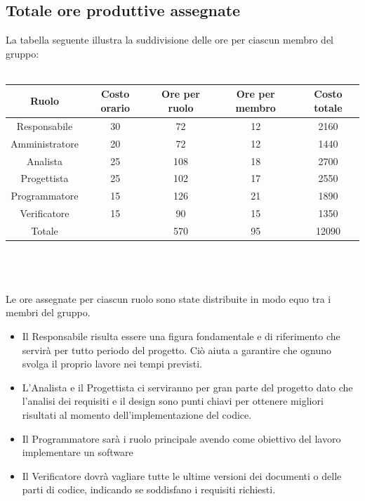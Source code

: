 \documentclass{article}
\begin{document}
\subsection{Totale ore produttive assegnate}
La tabella seguente illustra la suddivisione delle ore per ciascun membro del gruppo:\\ \\
\begin{tabular}{|c|c|c|c|c|}
\hline
\rowcolor{LightBlue}
Ruolo & Costo orario & Ore per ruolo & Ore per membro & Costo totale \\
\hline
\hline
\rowcolor{LighterBlue}
Responsabile & 30 & 72 & 12 & 2160 \\
Amministratore & 20 & 72 & 12 & 1440 \\
\rowcolor{LighterBlue}

Analista & 25 & 108 & 18 & 2700 \\
Progettista & 25 & 102 & 17 & 2550 \\
\rowcolor{LighterBlue}

Programmatore & 15 & 126 & 21 & 1890 \\
Verificatore & 15 & 90 & 15 & 1350 \\
\hline
\hline
\rowcolor{LightBlue}
Totale &  & 570 & 95 & 12090 \\
\hline
\end{tabular} 
\\ \\ \\ Le ore assegnate per ciascun ruolo sono state distribuite in modo equo tra i membri del gruppo. \\
\begin{itemize}
  \item Il Responsabile risulta essere una figura fondamentale e di riferimento che servirà per tutto periodo del progetto. Ciò aiuta a garantire che ognuno svolga il proprio lavore nei tempi previsti.
  \item L'Analista e il Progettista ci serviranno per gran parte del progetto dato che l'analisi dei requisiti e il design sono punti chiavi per ottenere migliori risultati al momento dell'implementazione del codice.
  \item Il Programmatore sarà i ruolo principale avendo come obiettivo del lavoro implementare un software
  \item Il Verificatore dovrà vagliare tutte le ultime versioni dei documenti o delle parti di codice, indicando se soddisfano i requisiti richiesti.
\end{itemize}
\end{document}
